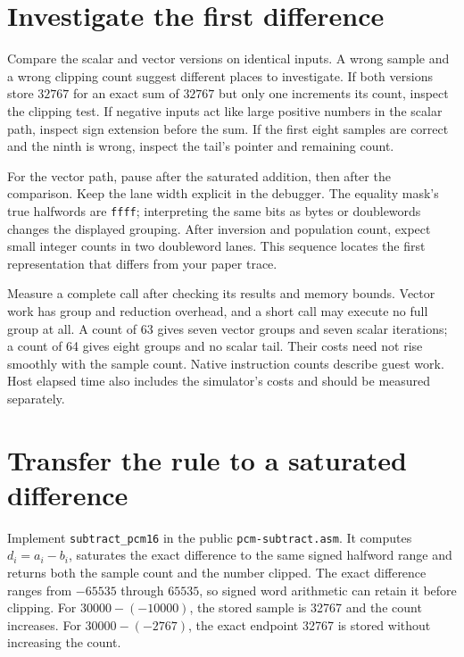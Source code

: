 \section{Investigate the first difference}

Compare the scalar and vector versions on identical inputs. A wrong sample and
a wrong clipping count suggest different places to investigate. If both versions
store $32767$ for an exact sum of $32767$ but only one increments its count, inspect
the clipping test. If negative inputs act like large positive numbers in the scalar
path, inspect sign extension before the sum. If the first eight samples are correct
and the ninth is wrong, inspect the tail's pointer and remaining count.

For the vector path, pause after the saturated addition, then after the comparison.
Keep the lane width explicit in the debugger. The equality mask's true halfwords
are \texttt{ffff}; interpreting the same bits as bytes or doublewords changes the
displayed grouping. After inversion and population count, expect small integer
counts in two doubleword lanes. This sequence locates the first representation
that differs from your paper trace.

Measure a complete call after checking its results and memory bounds. Vector work
has group and reduction overhead, and a short call may execute no full group at all.
A count of 63 gives seven vector groups and seven scalar iterations; a count of 64
gives eight groups and no scalar tail. Their costs need not rise smoothly with the
sample count. Native instruction counts describe guest work. Host elapsed time also
includes the simulator's costs and should be measured separately.

\section{Transfer the rule to a saturated difference}

Implement \texttt{subtract\_pcm16} in the public \texttt{pcm-subtract.asm}.
It computes $d_i=a_i-b_i$, saturates the exact difference to the same signed
halfword range and returns both the sample count and the number clipped.
The exact difference ranges from $-65535$ through $65535$, so signed word
arithmetic can retain it before clipping. For $30000-(-10000)$, the stored sample
is 32767 and the count increases. For $30000-(-2767)$, the exact endpoint 32767
is stored without increasing the count.

